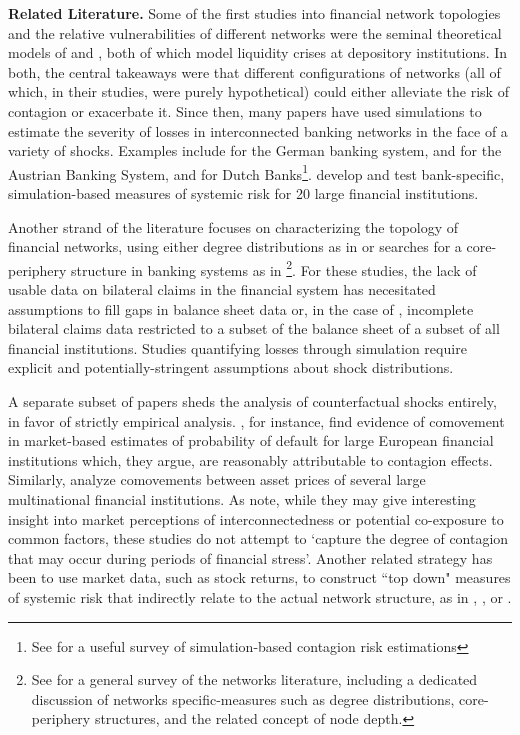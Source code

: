 \textbf{Related Literature.} Some of the first studies into financial network topologies and the relative vulnerabilities of different networks were the seminal theoretical models of \citet{allen2000financial} and \citet{freixas2000systemic}, both of which model liquidity crises at depository institutions. In both, the central takeaways were that different configurations of networks (all of which, in their studies, were purely hypothetical) could either alleviate the risk of contagion or exacerbate it. Since then, many papers have used simulations to estimate the severity of losses in interconnected banking networks in the face of a variety of shocks. Examples include \citet{upper2004estimating} for the German banking system, \citet{elsinger2006riska} and \citet{elsinger2006riskb} for the Austrian Banking System, and \citet{vanLelyveld2006} for Dutch Banks\footnote{See \citet{upper2011survey} for a useful survey of simulation-based contagion risk estimations}. \citet{drehmann2013} develop and test bank-specific, simulation-based measures of systemic risk for 20 large financial institutions. 

Another strand of the literature focuses on characterizing the topology of financial networks, using either degree distributions as in \citet{boss2004empirical} or searches for a core-periphery structure in banking systems as in \citet{craigvonpeter2014}\footnote{See \citet{glassermanSurvey2016} for a general survey of the networks literature, including a dedicated discussion of networks specific-measures such as degree distributions, core-periphery structures, and the related concept of node depth.}. For these studies, the lack of usable data on bilateral claims in the financial system has necesitated assumptions to fill gaps in balance sheet data or, in the case of \citet{vanLelyveld2006}, incomplete bilateral claims data restricted to a subset of the balance sheet of a subset of all financial institutions. Studies quantifying losses through simulation require explicit and potentially-stringent assumptions about shock distributions.

A separate subset of papers sheds the analysis of counterfactual shocks entirely, in favor of strictly empirical analysis. \citet{gropp2009}, for instance, find evidence of comovement in market-based estimates of  probability of default for large European financial institutions which, they argue, are reasonably attributable to contagion effects. Similarly, \citet{hawkesby2007} analyze comovements between asset prices of several large multinational financial institutions. As \citet{hawkesby2007} note, while they may give interesting insight into market perceptions of interconnectedness or potential co-exposure to common factors, these studies do not attempt to `capture the degree of contagion that may occur during periods of financial stress'. Another related strategy has been to use market data, such as stock returns, to construct ``top down" measures of systemic risk that indirectly relate to the actual network structure, as in \citet{adrian2016covar}, \citet{acharya2017measuring}, or \citet{brownlees2016srisk}.

